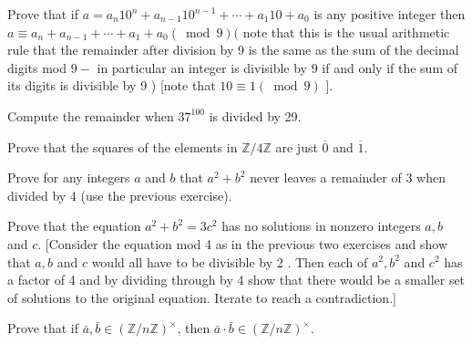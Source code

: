 \begin{questions}
\begin{solution}
\end{solution}

\question
    Prove that if \(a=a_n 10^n+a_{n-1} 10^{n-1}+\cdots+a_1 10+a_0\) is any positive integer then \(a \equiv a_n+a_{n-1}+\cdots+a_1+a_0(\bmod 9)(\) note that this is the usual arithmetic rule that the remainder after division by 9 is the same as the sum of the decimal digits mod \(9-\) in particular an integer is divisible by 9 if and only if the sum of its digits is divisible by 9 ) [note that \(10 \equiv 1(\bmod 9)\) ].


\begin{solution}
    
\end{solution}

\question
    Compute the remainder when \(37^{100}\) is divided by 29.


\begin{solution}
    
\end{solution}

\question
    Prove that the squares of the elements in \(\mathbb{Z} / 4 \mathbb{Z}\) are just \(\overline{0}\) and \(\overline{1}\).


\begin{solution}
    
\end{solution}

\question
    Prove for any integers \(a\) and \(b\) that \(a^2+b^2\) never leaves a remainder of 3 when divided by 4 (use the previous exercise).


\begin{solution}
    
\end{solution}


\question
    Prove that the equation \(a^2+b^2=3 c^2\) has no solutions in nonzero integers \(a, b\) and \(c\). [Consider the equation mod 4 as in the previous two exercises and show that \(a, b\) and \(c\) would all have to be divisible by 2 . Then each of \(a^2, b^2\) and \(c^2\) has a factor of 4 and by dividing through by 4 show that there would be a smaller set of solutions to the original equation. Iterate to reach a contradiction.]


\begin{solution}
    
\end{solution}


\question
    Prove that if \(\bar{a}, \bar{b} \in(\mathbb{Z} / n \mathbb{Z})^{\times}\), then \(\bar{a} \cdot \bar{b} \in(\mathbb{Z} / n \mathbb{Z})^{\times}\).



\end{questions}
